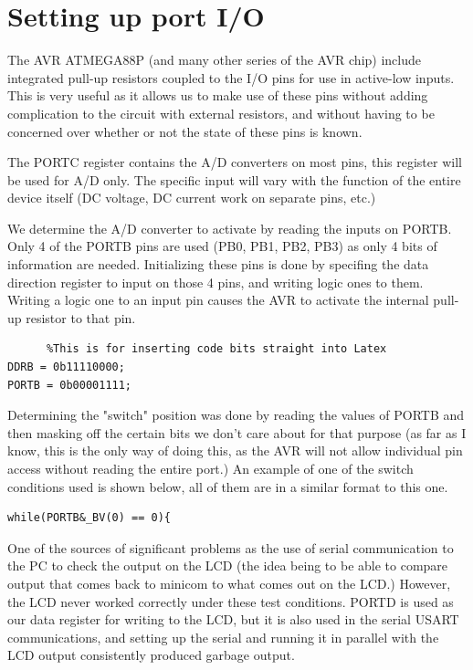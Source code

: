 \section{Setting up port I/O}



The AVR ATMEGA88P (and many other series of the AVR chip) include integrated pull-up resistors coupled to the I/O pins for use in active-low inputs. This is very useful as it allows us to make use of these pins without adding complication to the circuit with external resistors, and without having to be concerned over whether or not the state of these pins is known.

The PORTC register contains the A/D converters on most pins, this register will be used for A/D only. The specific input will vary with the function of the entire device itself (DC voltage, DC current work on separate pins, etc.)

We determine the A/D converter to activate by reading the inputs on PORTB. Only 4 of the PORTB pins are used (PB0, PB1, PB2, PB3) as only 4 bits of information are needed. Initializing these pins is done by specifing the data direction register to input on those 4 pins, and writing logic ones to them. Writing a logic one to an input pin causes the AVR to activate the internal pull-up resistor to that pin.

\begin{lstlisting}		%This is for inserting code bits straight into Latex
DDRB = 0b11110000;
PORTB = 0b00001111;
\end{lstlisting}

Determining the "switch" position was done by reading the values of PORTB and then masking off the certain bits we don't care about for that purpose (as far as I know, this is the only way of doing this, as the AVR will not allow individual pin access without reading the entire port.) An example of one of the switch conditions used is shown below, all of them are in a similar format to this one.

\begin{lstlisting}
while(PORTB&_BV(0) == 0){
\end{lstlisting}

One of the sources of significant problems as the use of serial communication to the PC to check the output on the LCD (the idea being to be able to compare output that comes back to minicom to what comes out on the LCD.) However, the LCD never worked correctly under these test conditions. PORTD is used as our data register for writing to the LCD, but it is also used in the serial USART communications, and setting up the serial and running it in parallel with the LCD output consistently produced garbage output.

